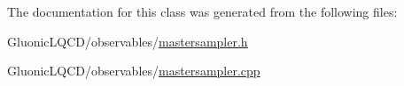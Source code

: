 The documentation for this class was generated from the following files\+:\begin{DoxyCompactItemize}
\item 
Gluonic\+L\+Q\+C\+D/observables/\mbox{\hyperlink{mastersampler_8h}{mastersampler.\+h}}\item 
Gluonic\+L\+Q\+C\+D/observables/\mbox{\hyperlink{mastersampler_8cpp}{mastersampler.\+cpp}}\end{DoxyCompactItemize}
